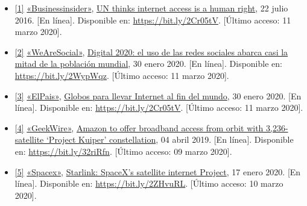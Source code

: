 \documentclass[12pt,spanish,Letterpaper,openany]{book}
\begin{document}
\begin{itemize}
\item
  \hypertarget{articulo04_ref01}{}

  \protect\hyperlink{articulo04_cross01}{{[}1{]}} \href{https://www.businessinsider.com/}{«Businessinsider»}, \href{https://www.businessinsider.com/un-says-internet-access-is-a-human-right-2016-7}{UN thinks internet access is a human right}, 22 julio 2016. {[}En línea{]}. Disponible en: \url{https://bit.ly/2Cr05tV}. {[}Último acceso: 11 marzo 2020{]}.
\item
  \hypertarget{articulo04_ref02}{}

  \protect\hyperlink{articulo04_cross02}{{[}2{]}} \href{https://wearesocial.com/}{«WeAreSocial»}, \href{https://wearesocial.com/es/blog/2020/01/digital-2020-el-uso-de-las-redes-sociales-abarca-casi-la-mitad-de-la-poblacion-mundial}{Digital 2020: el uso de las redes sociales abarca casi la mitad de la población mundial}, 30 enero 2020. {[}En línea{]}. Disponible en: \url{https://bit.ly/2WypWqz}. {[}Último acceso: 11 marzo 2020{]}.
\item
  \hypertarget{articulo04_ref03}{}

  \protect\hyperlink{articulo04_cross03}{{[}3{]}} \href{https://elpais.com/}{«ElPais»}, \href{https://elpais.com/elpais/2018/07/24/planeta_futuro/1532414715_476889.html}{Globos para llevar Internet al fin del mundo}, 30 enero 2020. {[}En línea{]}. Disponible en: \url{https://bit.ly/2Cr05tV}. {[}Último acceso: 11 marzo 2020{]}.
\item
  \hypertarget{articulo04_ref05}{}

  \protect\hyperlink{articulo04_cross04}{{[}4{]}} \href{https://www.geekwire.com/}{«GeekWire»}, \href{https://www.geekwire.com/2019/amazon-project-kuiper-broadband-satellite/}{Amazon to offer broadband access from orbit with 3,236-satellite `Project Kuiper' constellation}, 04 abril 2019. {[}En línea{]}. Disponible en: \url{https://bit.ly/32riRfn}. {[}Último acceso: 09 marzo 2020{]}.
\item
  \hypertarget{articulo04_ref04}{}

  \protect\hyperlink{articulo04_cross05}{{[}5{]}} \href{https://www.space.com/}{«Spacex»}, \href{https://www.space.com/spacex-starlink-satellites.html}{Starlink: SpaceX's satellite internet Project}, 17 enero 2020. {[}En línea{]}. Disponible en: \url{https://bit.ly/2ZHvuRL}. {[}Último acceso: 10 marzo 2020{]}.
\end{itemize}

\end{document}
